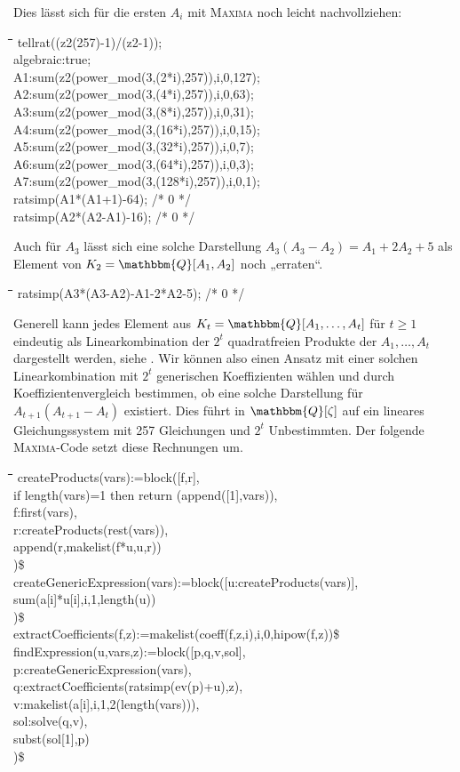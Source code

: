 \documentclass[11pt]{article}
\newcommand{\br}[1]{\ensuremath{\left(#1\right)}}
\newcommand{\Q}{\mathbbm{Q}}
\def\pw{{\char94}}
\newenvironment{code}{\tt \begin{tabbing}
\hskip12pt\=\hskip12pt\=\hskip12pt\=\hskip12pt\=\hskip5cm\=\hskip5cm\=\kill}
{\end{tabbing}}
\begin{document}
Dies lässt sich für die ersten $A_i$ mit \textsc{Maxima} noch leicht
nachvollziehen:
\begin{code}
tellrat((z2\pw(257)-1)/(z2-1));\\
algebraic:true;\\
A1:sum(z2\pw(power\_mod(3,(2*i),257)),i,0,127);\\
A2:sum(z2\pw(power\_mod(3,(4*i),257)),i,0,63);\\
A3:sum(z2\pw(power\_mod(3,(8*i),257)),i,0,31);\\
A4:sum(z2\pw(power\_mod(3,(16*i),257)),i,0,15);\\
A5:sum(z2\pw(power\_mod(3,(32*i),257)),i,0,7);\\
A6:sum(z2\pw(power\_mod(3,(64*i),257)),i,0,3);\\
A7:sum(z2\pw(power\_mod(3,(128*i),257)),i,0,1);\\
ratsimp(A1*(A1+1)-64);   /* 0 */\\
ratsimp(A2*(A2-A1)-16);  /* 0 */
\end{code}
Auch für $A_3$ lässt sich eine solche Darstellung $A_3\br{A_3-A_2}=A_1+2A_2+5$
als Element von $K_2=\Q[A_1,A_2]$ noch „erraten“.
\begin{code}
ratsimp(A3*(A3-A2)-A1-2*A2-5); /* 0 */
\end{code}
Generell kann jedes Element aus $K_t=\Q[A_1,\ldots,A_t]$ für $t\ge 1$
eindeutig als Linearkombination der $2^t$ quadratfreien Produkte der
$A_1,\ldots,A_t$ dargestellt werden, siehe \cite[Kapitel 4]{Graebe2020}.  Wir
können also einen Ansatz mit einer solchen Linearkombination mit $2^t$
generischen Koeffizienten wählen und durch Koeffizientenvergleich bestimmen,
ob eine solche Darstellung für $A_{t+1}\br{A_{t+1}-A_t}$ existiert. Dies führt
in $\Q[\zeta]$ auf ein lineares Gleichungssystem mit 257 Gleichungen und $2^t$
Unbestimmten. Der folgende \textsc{Maxima}-Code setzt diese Rechnungen um.
\begin{code}  
createProducts(vars):=block([f,r],\+\\
  if length(vars)=1 then return (append([1],vars)),\\
  f:first(vars),\\
  r:createProducts(rest(vars)),\\
  append(r,makelist(f*u,u,r))\-\\
)\$\\[1em]

createGenericExpression(vars):=block([u:createProducts(vars)],\+\\
  sum(a[i]*u[i],i,1,length(u))\-\\
)\$\\[1em]

extractCoefficients(f,z):=makelist(coeff(f,z,i),i,0,hipow(f,z))\$\\[1em]

findExpression(u,vars,z):=block([p,q,v,sol],\+\\
p:createGenericExpression(vars),\\
q:extractCoefficients(ratsimp(ev(p)+u),z),\\
v:makelist(a[i],i,1,2\pw(length(vars))),\\
sol:solve(q,v),\\
subst(sol[1],p)\-\\
)\$
\end{code}
\end{document}

